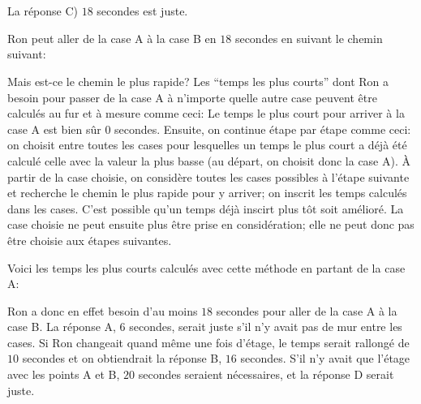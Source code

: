 {{\section*{\BrochureSolution}
La réponse C) $18$ secondes est juste.

Ron peut aller de la case A à la case B en $18$ secondes en suivant le chemin suivant:

{\centering%
\par}

Mais est-ce le chemin le plus rapide? Les “temps les plus courts” dont Ron a besoin pour passer de la case A à n’importe quelle autre case peuvent être calculés au fur et à mesure comme ceci:
Le temps le plus court pour arriver à la case A est bien sûr $0$ secondes. Ensuite, on continue étape par étape comme ceci: on choisit entre toutes les cases pour lesquelles un temps le plus court a déjà été calculé celle avec la valeur la plus basse (au départ, on choisit donc la case A). À partir de la case choisie, on considère toutes les cases possibles à l’étape suivante et recherche le chemin le plus rapide pour y arriver; on inscrit les temps calculés dans les cases. C’est possible qu’un temps déjà inscirt plus tôt soit amélioré. La case choisie ne peut ensuite plus être prise en considération; elle ne peut donc pas être choisie aux étapes suivantes.

Voici les temps les plus courts calculés avec cette méthode en partant de la case A:

{\centering%
\par}

Ron a donc en effet besoin d’au moins $18$ secondes pour aller de la case A à la case B. La réponse A, $6$ secondes, serait juste s’il n’y avait pas de mur entre les cases. Si Ron changeait quand même une fois d’étage, le temps serait rallongé de $10$ secondes et on obtiendrait la réponse B, $16$ secondes. S’il n’y avait que l’étage avec les points A et B, $20$ secondes seraient nécessaires, et la réponse D serait juste.



}}
